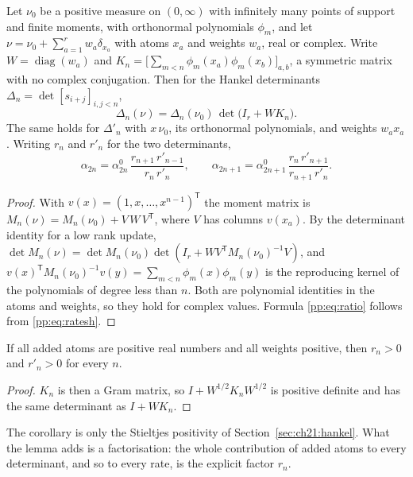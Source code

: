 \begin{lemma}\label{pp:thm:pair}
Let $\nu_0$ be a positive measure on $(0,\infty)$ with infinitely many points of support and finite moments, with orthonormal polynomials $\phi_m$, and let $\nu=\nu_0+\sum_{a=1}^rw_a\delta_{x_a}$ with atoms $x_a$ and weights $w_a$, real or complex. Write $W=\operatorname{diag}(w_a)$ and $K_n=\big[\sum_{m<n}\phi_m(x_a)\phi_m(x_b)\big]_{a,b}$, a symmetric matrix with no complex conjugation. Then for the Hankel determinants $\Delta_n=\det[s_{i+j}]_{i,j<n}$,
\[
\Delta_n(\nu)=\Delta_n(\nu_0)\,\det\big(I_r+WK_n\big).
\]
The same holds for $\Delta'_n$ with $x\,\nu_0$, its orthonormal polynomials, and weights $w_ax_a$. Writing $r_n$ and $r'_n$ for the two determinants,
\begin{equation}\label{pp:eq:ratio}
\alpha_{2n}=\alpha^0_{2n}\,\frac{r_{n+1}\,r'_{n-1}}{r_n\,r'_n},\qquad
\alpha_{2n+1}=\alpha^0_{2n+1}\,\frac{r_n\,r'_{n+1}}{r_{n+1}\,r'_n}.
\end{equation}
\end{lemma}

\begin{proof}
With $v(x)=(1,x,\dots,x^{n-1})^{\mathsf T}$ the moment matrix is $M_n(\nu)=M_n(\nu_0)+V\,W\,V^{\mathsf T}$, where $V$ has columns $v(x_a)$. By the determinant identity for a low rank update, $\det M_n(\nu)=\det M_n(\nu_0)\det(I_r+WV^{\mathsf T}M_n(\nu_0)^{-1}V)$, and $v(x)^{\mathsf T}M_n(\nu_0)^{-1}v(y)=\sum_{m<n}\phi_m(x)\phi_m(y)$ is the reproducing kernel of the polynomials of degree less than $n$. Both are polynomial identities in the atoms and weights, so they hold for complex values. Formula \eqref{pp:eq:ratio} follows from \eqref{pp:eq:ratesh}.
\end{proof}

\begin{corollary}\label{pp:cor:real}
If all added atoms are positive real numbers and all weights positive, then $r_n>0$ and $r'_n>0$ for every $n$.
\end{corollary}

\begin{proof}
$K_n$ is then a Gram matrix, so $I+W^{1/2}K_nW^{1/2}$ is positive definite and has the same determinant as $I+WK_n$.
\end{proof}

The corollary is only the Stieltjes positivity of Section~\ref{sec:ch21:hankel}. What the lemma adds is a factorisation: the whole contribution of added atoms to every determinant, and so to every rate, is the explicit factor $r_n$.

